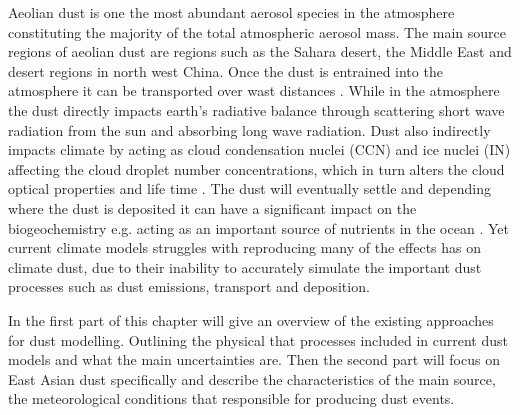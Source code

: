 Aeolian dust is one the most abundant aerosol species in the atmosphere constituting the majority of the total atmospheric  aerosol mass. The main source regions of aeolian dust are regions such as the Sahara desert, the Middle East and desert regions in north west China. Once the dust is entrained into the atmosphere it can be transported over wast distances \parencite{yumimoto_elevated_2009}. While in the atmosphere the dust directly impacts earth’s radiative balance through scattering short wave radiation from the sun and absorbing long wave radiation. Dust also indirectly impacts climate by acting as cloud condensation nuclei (CCN) and ice nuclei (IN) affecting the cloud droplet number concentrations, which in turn alters the cloud optical properties and life time \parencite{lohmann2006sensitivity}. The dust will eventually settle and depending where the dust is deposited it can have a significant impact on the biogeochemistry e.g. acting as an important source of nutrients in the ocean \parencite{jickells_dust_biogeo_2015}. Yet current climate models struggles with reproducing many of  the effects has on climate dust, due to their inability to accurately simulate the important dust processes such as dust emissions, transport and deposition. 

In the first part of this chapter  will give an overview of the existing approaches for dust modelling. Outlining the physical that processes included in current dust models and what the main uncertainties are. Then the second part will focus on East Asian dust specifically and describe the characteristics of the main source, the meteorological conditions that responsible for producing dust events.     



